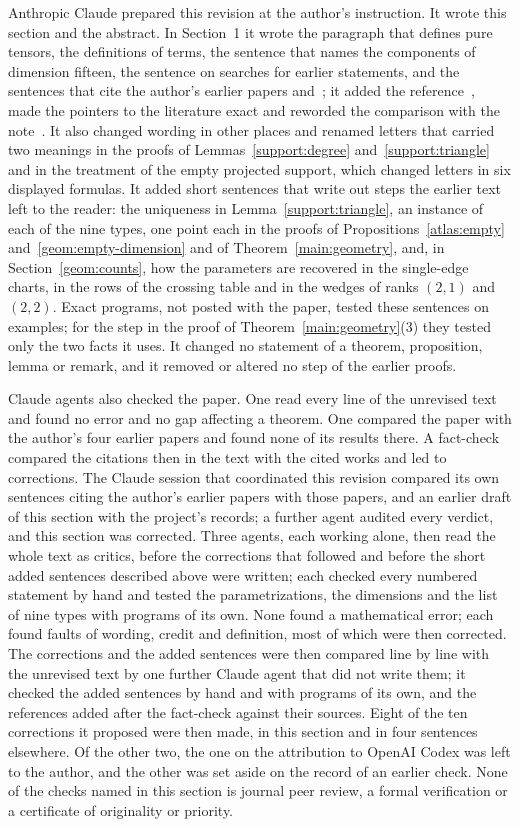 \documentclass[11pt,letterpaper]{article}
\theoremstyle{definition}
\begin{document}
Anthropic Claude prepared this revision at the author's instruction. It
wrote this section and the abstract. In Section~1 it wrote the paragraph
that defines pure tensors, the definitions of terms, the sentence that
names the components of dimension fifteen, the sentence on searches for
earlier statements, and the sentences that cite the author's earlier
papers and~\cite{kgz}; it added the reference~\cite{naslund}, made the
pointers to the literature exact and reworded the comparison with the
note~\cite{axis}. It also changed wording in other places and renamed
letters that carried two meanings in the proofs of
Lemmas~\ref{support:degree} and~\ref{support:triangle} and in the
treatment of the empty projected support, which changed letters in six
displayed formulas. It added short sentences that write out steps the
earlier text left to the reader: the uniqueness in
Lemma~\ref{support:triangle}, an instance of each of the nine types, one
point each in the proofs of Propositions~\ref{atlas:empty}
and~\ref{geom:empty-dimension} and of Theorem~\ref{main:geometry}, and,
in Section~\ref{geom:counts}, how the parameters are recovered in the
single-edge charts, in the rows of the crossing table and in the wedges
of ranks \((2,1)\) and \((2,2)\). Exact programs, not posted with the
paper, tested these sentences on examples; for the step in the proof of
Theorem~\ref{main:geometry}(3) they tested only the two facts it uses.
It changed no statement of a theorem, proposition, lemma or remark, and
it removed or altered no step of the earlier proofs.

Claude agents also checked the paper. One read every line of the
unrevised text and found no error and no gap affecting a theorem. One
compared the paper with the author's four earlier papers and found none
of its results there. A fact-check compared the citations then in the
text with the cited works and led to corrections. The Claude session that
coordinated this revision compared its own sentences citing the author's
earlier papers with those papers, and an earlier draft of this section
with the project's records; a further agent audited every verdict, and
this section was corrected. Three agents, each working alone, then read
the whole text as critics, before the corrections that followed and
before the short added sentences described above were written; each
checked every numbered statement by hand and tested the
parametrizations, the dimensions and the list of nine types with programs
of its own. None found a mathematical error; each found faults of
wording, credit and definition, most of which were then corrected. The
corrections and the added sentences were then compared line by line with
the unrevised text by one further Claude agent that did not write them;
it checked the added sentences by hand and with programs of its own, and
the references added after the fact-check against their sources.
Eight of the ten corrections it proposed were then made, in this section
and in four sentences elsewhere. Of the other two, the one on the
attribution to OpenAI Codex was left to the author, and the other was set
aside on the record of an earlier check. None of the checks named in this
section is journal peer review, a formal verification or a certificate of
originality or priority.
\end{document}
